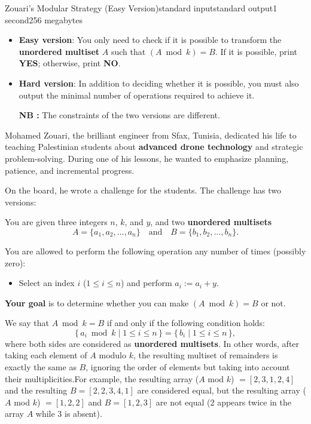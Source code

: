 \begin{problem}{Zouari's Modular Strategy (Easy Version)}{standard input}{standard output}{1 second}{256 megabytes}

\begin{itemize}
  \item \textbf{Easy version}: You only need to check if it is possible to transform the \textbf{unordered multiset} $A$ such that $(A \bmod k) = B$. If it is possible, print \textbf{YES}; otherwise, print \textbf{NO}.
  \item \textbf{Hard version}: In addition to deciding whether it is possible, you must also output the minimal number of operations required to achieve it. 

\textbf{NB : } The constraints of the two versions are different.
\end{itemize}


Mohamed Zouari, the brilliant engineer from Sfax, Tunisia, dedicated his life to teaching Palestinian students about \textbf{advanced drone technology} and strategic problem-solving. During one of his lessons, he wanted to emphasize planning, patience, and incremental progress.

On the board, he wrote a challenge for the students. The challenge has two versions:


You are given three integers $n$, $k$, and $y$, and two \textbf{unordered multisets}
$$A = \{a_1, a_2, \dots, a_n\}\quad\text{and}\quad B = \{b_1, b_2, \dots, b_n\}.$$

You are allowed to perform the following operation any number of times (possibly zero):
\begin{itemize}
  \item Select an index $i$ ($1 \le i \le n$) and perform $a_i := a_i + y$.
\end{itemize}

\textbf{Your goal} is to determine whether you can  make $(A \bmod k) = B$ or not.

We say that $A \bmod k = B$ if and only if the following condition holds:
$$
\{\, a_i \bmod k \mid 1 \le i \le n \,\}
=
\{\, b_i \mid 1 \le i \le n \,\},
$$
where both sides are considered as \textbf{unordered multisets}. In other words, after taking each element of $A$ modulo $k$, the resulting multiset of remainders is exactly the same as $B$, ignoring the order of elements but taking into account their multiplicities.For example, the resulting array ($A$ mod $k$) $= [2,3,1,2,4]$ and the resulting $B = [2,2,3,4,1]$ are considered equal, but the resulting array ($A$ mod $k$) $= [1,2,2]$ and $ B =[1,2,3]$  are not equal ($2$ appears twice in the array $A$ while $3$ is absent).


\end{problem}
